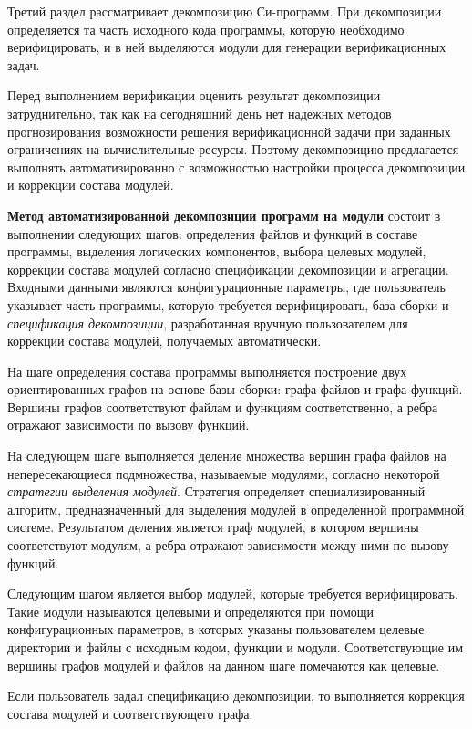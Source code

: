 \documentclass[%
autoref,
colorlinks,  
facsimile,   %
]{disser}
\begin{document}
Третий раздел рассматривает декомпозицию Си-программ.
При декомпозиции определяется та часть исходного кода программы, которую необходимо верифицировать, и в ней выделяются модули для генерации верификационных задач.

Перед выполнением верификации оценить результат декомпозиции затруднительно, так как на сегодняшний день нет надежных методов прогнозирования возможности решения верификационной задачи при заданных ограничениях на вычислительные ресурсы.
Поэтому декомпозицию предлагается выполнять автоматизированно с возможностью настройки процесса декомпозиции и коррекции состава модулей.

\textbf{Метод автоматизированной декомпозиции программ на модули} состоит в выполнении следующих шагов: определения файлов и функций в составе программы, выделения логических компонентов, выбора целевых модулей, коррекции состава модулей согласно спецификации декомпозиции и агрегации.
Входными данными являются конфигурационные параметры, где пользователь указывает часть программы, которую требуется верифицировать, база сборки и \textit{спецификация декомпозиции}, разработанная вручную пользователем для коррекции состава модулей, получаемых автоматически.

На шаге определения состава программы выполняется построение двух ориентированных графов на основе базы сборки: графа файлов и графа функций.
Вершины графов соответствуют файлам и функциям соответственно, а ребра отражают зависимости по вызову функций.

На следующем шаге выполняется деление множества вершин графа файлов на непересекающиеся подмножества, называемые модулями, согласно некоторой \textit{стратегии выделения модулей}.
Стратегия определяет специализированный алгоритм, предназначенный для выделения модулей в определенной программной системе.
Результатом деления является граф модулей, в котором вершины соответствуют модулям, а ребра отражают зависимости между ними по вызову функций.

Следующим шагом является выбор модулей, которые требуется верифицировать.
Такие модули называются целевыми и определяются при помощи конфигурационных параметров, в которых указаны пользователем целевые директории и файлы с исходным кодом, функции и модули.
Соответствующие им вершины графов модулей и файлов на данном шаге помечаются как целевые.

Если пользователь задал спецификацию декомпозиции, то выполняется коррекция состава модулей и соответствующего графа. 
\end{document}
